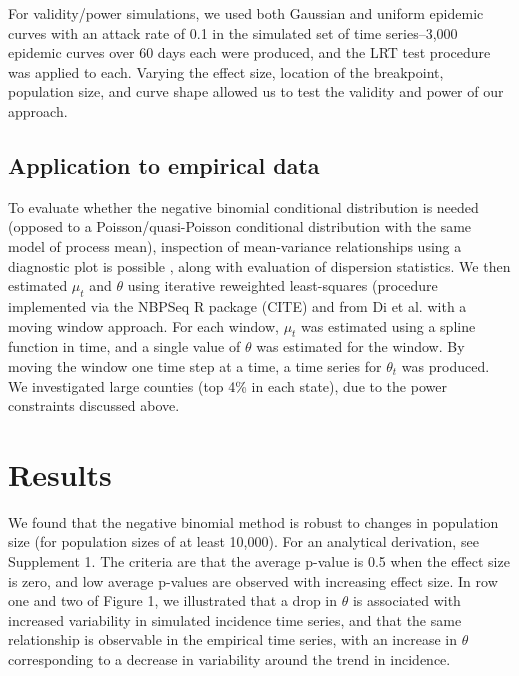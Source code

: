 \documentclass[10pt,letterpaper]{article}
\begin{document}
For validity/power simulations, we used both Gaussian and uniform epidemic curves with an attack rate of 0.1 in the simulated set of time series--3,000 epidemic curves over 60 days each were produced, and the LRT test procedure was applied to each. 
Varying the effect size, location of the breakpoint, population size, and curve shape allowed us to test the validity and power of our approach.

\subsection*{Application to empirical data}
To evaluate whether the negative binomial conditional distribution is needed (opposed to a Poisson/quasi-Poisson conditional distribution with the same model of process mean), inspection of mean-variance relationships using a diagnostic plot is possible \cite{ver_hoef_quasi-poisson_2007}, along with evaluation of dispersion statistics.
We then estimated \begin{math}\mu_t\end{math} and \begin{math}\theta\end{math} using iterative reweighted least-squares (procedure implemented via the NBPSeq R package (CITE) and from Di et al. \cite{yanming_nbp_2011} with a moving window approach. For each window, \begin{math}\mu_t\end{math} was estimated using a spline function in time, and a single value of \begin{math}\theta\end{math} was estimated for the window. By moving the window one time step at a time, a time series for \begin{math}\theta_t\end{math} was produced. We investigated large counties (top 4\% in each state), due to the power constraints discussed above.

\section*{Results}
We found that the negative binomial method is robust to changes in population size (for population sizes of at least 10,000). 
For an analytical derivation, see Supplement 1.
The criteria are that the average p-value is 0.5 when the effect size is zero, and low average p-values are observed with increasing effect size. 
In row one and two of Figure 1, we illustrated that a drop in \begin{math}\theta\end{math} is associated with increased variability in simulated incidence time series, and that the same relationship is observable in the empirical time series, with an increase in \begin{math}\theta\end{math} corresponding to a decrease in variability around the trend in incidence.
\end{document}
